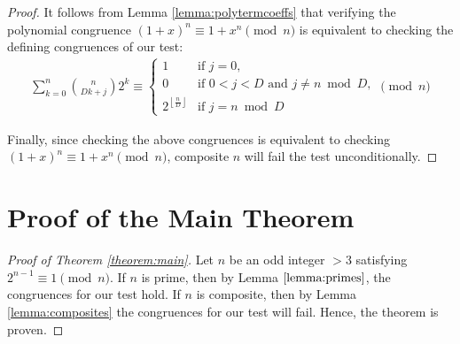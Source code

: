 \documentclass{article}
\theoremstyle{plain}
\theoremstyle{definition}
\newcommand{\floor}[1]{\left\lfloor #1 \right\rfloor}
\begin{document}
\begin{proof}
It follows from Lemma \ref{lemma:polytermcoeffs} that verifying the polynomial congruence $(1 + x)^n \equiv 1 + x^n \pmod{n}$ is equivalent to checking the defining congruences of our test:
\begin{align*}
    \sum_{k=0}^{n} \binom{n}{Dk + j} 2^k
    \equiv
    \begin{cases} 
        1 & \text{if } j=0, \\
        0 & \text{if } 0 < j < D \text{ and } j \neq n \bmod{D}, \\
        2^{\floor{\frac{n}{D}}} & \text{if } j = n \bmod{D}
    \end{cases}
    \pmod{n}
\end{align*}

Finally, since checking the above congruences is equivalent to checking $(1 + x)^n \equiv 1 + x^n \pmod{n}$, composite $n$ will fail the test unconditionally.
\end{proof}

\section{Proof of the Main Theorem}
\begin{proof}[Proof of Theorem \ref{theorem:main}]
Let \( n \) be an odd integer $>3$ satisfying $2^{n-1} \equiv 1 \pmod{n}$. If $n$ is prime, then by Lemma $\ref{lemma:primes}$, the congruences for our test hold. If $n$ is composite, then by Lemma \ref{lemma:composites} the congruences for our test will fail. Hence, the theorem is proven.
\end{proof}
\end{document}
